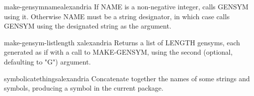 \begin{function}{make-gensym}{name}{alexandria}{}
  If NAME is a non-negative integer, calls GENSYM using it. Otherwise NAME
must be a string designator, in which case calls GENSYM using the designated
string as the argument.
\end{function}

\begin{function}{make-gensym-list}{length \op x}{alexandria}{}
  Returns a list of LENGTH gensyms, each generated as if with a call to MAKE-GENSYM,
using the second (optional, defaulting to "G") argument.
\end{function}

\begin{function}{symbolicate}{\rest things}{alexandria}{}
  Concatenate together the names of some strings and symbols,
producing a symbol in the current package.
\end{function}

